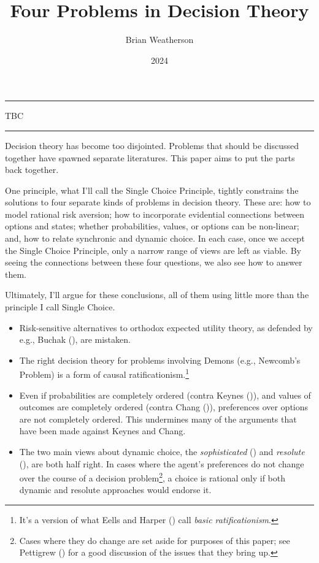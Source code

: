 \documentclass[
  10pt,
  letterpaper,
  DIV=11,
  numbers=noendperiod,
  twoside]{scrartcl}
\title{Four Problems in Decision Theory}
\author{Brian Weatherson}
\date{2024}
\providecommand{\tightlist}{%
  \setlength{\itemsep}{0pt}\setlength{\parskip}{0pt}}\usepackage{longtable,booktabs,array}
\renewenvironment{abstract}
 {\vspace{-1.25cm}
 \quotation\small\noindent\rule{\linewidth}{.5pt}\par\smallskip
 \noindent }
 {\par\noindent\rule{\linewidth}{.5pt}\endquotation}
\begin{document}
\maketitle
\begin{abstract}
TBC
\end{abstract}

Decision theory has become too disjointed. Problems that should be
discussed together have spawned separate literatures. This paper aims to
put the parts back together.

One principle, what I'll call the Single Choice Principle, tightly
constrains the solutions to four separate kinds of problems in decision
theory. These are: how to model rational risk aversion; how to
incorporate evidential connections between options and states; whether
probabilities, values, or options can be non-linear; and, how to relate
synchronic and dynamic choice. In each case, once we accept the Single
Choice Principle, only a narrow range of views are left as viable. By
seeing the connections between these four questions, we also see how to
answer them.

Ultimately, I'll argue for these conclusions, all of them using little
more than the principle I call Single Choice.

\begin{itemize}
\tightlist
\item
  Risk-sensitive alternatives to orthodox expected utility theory, as
  defended by e.g., Buchak (), are
  mistaken.
\item
  The right decision theory for problems involving Demons (e.g.,
  Newcomb's Problem) is a form of causal ratificationism.\footnote{It's
    a version of what Eells and Harper
    () call \emph{basic
    ratificationism}.}
\item
  Even if probabilities are completely ordered (contra Keynes
  ()), and values of outcomes are
  completely ordered (contra Chang ()),
  preferences over options are not completely ordered. This undermines
  many of the arguments that have been made against Keynes and Chang.
\item
  The two main views about dynamic choice, the \emph{sophisticated}
  () and \emph{resolute}
  (), are both half right.
  In cases where the agent's preferences do not change over the course
  of a decision problem\footnote{Cases where they do change are set
    aside for purposes of this paper; see Pettigrew
    () for a good discussion of the
    issues that they bring up.}, a choice is rational only if both
  dynamic and resolute approaches would endorse it.
\end{itemize}
\end{document}
